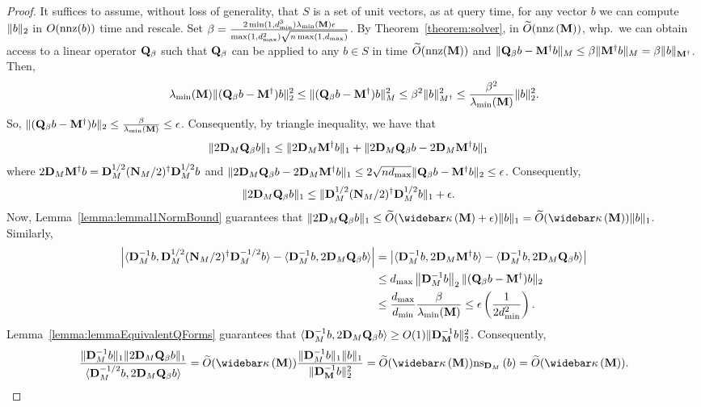 \begin{proof} It suffices to assume, without loss of generality, that $S$ is a set of unit vectors, as at query time, for any vector $b$ we can compute $\|b\|_2$ in $O(\mathrm{nnz}(b))$ time and rescale. Set $\beta = \frac{ 2\min(1, d_{\min}^{3}) \lambda_{\mathrm{min}}(\mathbf{M}) \epsilon}{\max(1, d_{\max}^2) \sqrt{n\max(1, d_{\max})}}$. By Theorem~\ref{theorem:solver}, in $\widetilde{O}( {\mathrm{nnz}\left({\mathbf{M}}\right)} )$, whp.\ we can obtain access to a linear operator $\mathbf{Q}_\beta$ such that $\mathbf{Q}_\beta$ can be applied to any $b \in S$ in time $\widetilde{O}( {\mathrm{nnz}(\mathbf{M})} )$ and $\|\mathbf{Q}_\beta b - \mathbf{M}^\dagger b\|_M \leq \beta \|\mathbf{M}^\dagger b\|_M = \beta \|b\|_{\mathbf{M}^\dagger}$. Then, 
\begin{align*}
    \lambda_{\mathrm{min}}(\mathbf{M}) \|(\mathbf{Q}_\beta b - \mathbf{M}^\dagger)b\|_2^2 \leq \|(\mathbf{Q}_\beta b - \mathbf{M}^\dagger)b\|_M^2 \leq \beta^2 \|b\|_{M^\dagger}^2 \leq \frac{\beta^2}{\lambda_{\mathrm{min}}(\mathbf{M})} \|b\|_2^2. 
\end{align*}
So, $ \|(\mathbf{Q}_\beta b - \mathbf{M}^\dagger)b\|_2 \leq \frac{\beta}{\lambda_{\mathrm{min}}(\mathbf{M})} \leq \epsilon$. Consequently, by triangle inequality, we have that 
\begin{align*}
    \|2{\mathbf{D}}_{M} \mathbf{Q}_\beta b\|_1  &\leq \|2{\mathbf{D}}_{M}\mathbf{M}^\dagger b\|_1 + \|2{\mathbf{D}}_{M}\mathbf{Q}_\beta b -  2{\mathbf{D}}_{M}\mathbf{M}^\dagger b\|_1
\end{align*}
where $2{\mathbf{D}}_{M}\mathbf{M}^\dagger b = {\mathbf{D}}_{M}^{1/2}(\mathbf{N}_{M}/2)^\dagger {\mathbf{D}}_{M}^{1/2} b$ and $\|2{\mathbf{D}}_{M}\mathbf{Q}_\beta b -  2{\mathbf{D}}_{M}\mathbf{M}^\dagger b\|_1 \leq 2\sqrt{n d_{\max}} \|\mathbf{Q}_\beta b -  \mathbf{M}^\dagger b\|_2 \leq \epsilon$. Consequently, 
\begin{align*}
    \|2{\mathbf{D}}_{M} \mathbf{Q}_\beta b\|_1  &\leq \|{\mathbf{D}}_{M}^{1/2}(\mathbf{N}_{M}/2)^\dagger {\mathbf{D}}_{M}^{1/2} b\|_1 + \epsilon.  
\end{align*}
Now, Lemma~\ref{lemma:lemmal1NormBound} guarantees that $\norm{2\diagonal{M} \Q_\beta b}_1 \leq \Otilde{\pcondOf{\M} + \epsilon} \norm{b}_1 = \Otilde{\pcondOf{\M}}\norm{b}_1$. Similarly, 
\begin{align*}
    \left| \langle {\mathbf{D}}_{M}^{-1} b, {\mathbf{D}}_{M}^{1/2}(\mathbf{N}_{M}/2)^\dagger {\mathbf{D}}_{M}^{-1/2} b \rangle - \langle {\mathbf{D}}_{M}^{-1}b, 2{\mathbf{D}}_{M} \mathbf{Q}_\beta b\rangle  \right| &= \left| \langle {\mathbf{D}}_{M}^{-1} b, 2{\mathbf{D}}_{M}\mathbf{M}^\dagger b \rangle - \langle {\mathbf{D}}_{M}^{-1}b, 2{\mathbf{D}}_{M} \mathbf{Q}_\beta b\rangle  \right| \\
    &\leq d_{\max} \left\|{\mathbf{D}}_{M}^{-1} b\right\|_2  \|(\mathbf{Q}_\beta b - \mathbf{M}^\dagger)b\|_2 \\
    &\leq \frac{d_{\max}}{d_{\min}} \frac{\beta}{\lambda_{\mathrm{min}}(\mathbf{M})} 
    \leq \epsilon \left( \frac{1}{2d_{\min}^2} \right).
\end{align*}
Lemma~\ref{lemma:lemmaEquivalentQForms} guarantees that $\langle {\mathbf{D}}_{M}^{-1}b, 2{\mathbf{D}}_{M} \mathbf{Q}_\beta b\rangle \geq O(1) \|{\mathbf{D}}_{\mathbf{M}}^{-1}b\|_2^2$. Consequently, 
\begin{align*}
    \frac{\norm{\diagonal{M}^{-1}b}_1 \norm{2\diagonal{M} \Q_\beta b}_1}{\langle \diagonal{M}^{-1/2}b, 2\diagonal{M} \Q_\beta b\rangle} = \Otilde{\pcondOf{\M}} \frac{\norm{\diagonal{M}^{-1}b}_1 \norm{b}_1}{\norm{\diagonal{\M}^{-1}b}_2^2} =\Otilde{\pcondOf{\M}} \nsD{\diagonal{M}}{b} = \Otilde{\pcondOf{\M}}.
\end{align*}


\end{proof}

